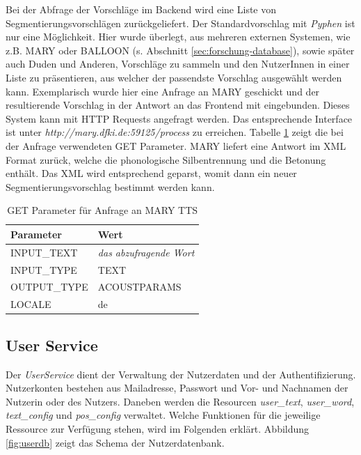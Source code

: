Bei der Abfrage der Vorschläge im Backend wird eine Liste von Segmentierungsvorschlägen zurückgeliefert. Der Standardvorschlag mit \textit{Pyphen} ist nur eine Möglichkeit. Hier wurde überlegt, aus mehreren externen Systemen, wie z.B. MARY oder BALLOON (s. Abschnitt \ref{sec:forschung-database}), sowie später auch Duden und Anderen, Vorschläge zu sammeln und den NutzerInnen in einer Liste zu präsentieren, aus welcher der passendste Vorschlag ausgewählt werden kann. Exemplarisch wurde hier eine Anfrage an MARY geschickt und der resultierende Vorschlag in der Antwort an das Frontend mit eingebunden. Dieses System kann mit HTTP Requests angefragt werden. Das entsprechende Interface ist unter \textit{http://mary.dfki.de:59125/process} zu erreichen. Tabelle \ref{table:mary} zeigt die bei der Anfrage verwendeten GET Parameter. MARY liefert eine Antwort im XML Format zurück, welche die phonologische Silbentrennung und die Betonung enthält. Das XML wird entsprechend geparst, womit dann ein neuer Segmentierungsvorschlag bestimmt werden kann.

\begin{table}[h!]
	\centering
	\begin{tabular}{|l|l|}
		\hline
		\textbf{Parameter} & \textbf{Wert}\\
		\hline
		\hline
		INPUT\_TEXT & \textit{das abzufragende Wort}\\
		INPUT\_TYPE & TEXT\\
		OUTPUT\_TYPE & ACOUSTPARAMS\\
		LOCALE & de\\
		\hline
	\end{tabular}
	\caption{GET Parameter für Anfrage an MARY TTS}
	\label{table:mary}
\end{table}

\subsection{User Service}
\label{sec:userservice}

Der \textit{UserService} dient der Verwaltung der Nutzerdaten und der Authentifizierung. Nutzerkonten bestehen aus Mailadresse, Passwort und Vor- und Nachnamen der Nutzerin oder des Nutzers. Daneben werden die Resourcen \textit{user\_text}, \textit{user\_word}, \textit{text\_config} und \textit{pos\_config} verwaltet. Welche Funktionen für die jeweilige Ressource zur Verfügung stehen, wird im Folgenden erklärt. Abbildung \ref{fig:userdb} zeigt das Schema der Nutzerdatenbank.

